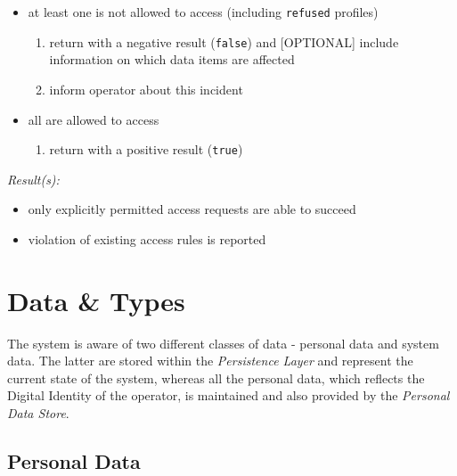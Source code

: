 \documentclass[12pt,english,a4paper,titlepage,cleardoublepage=empty,dottedtoc]{report}
\providecommand{\tightlist}{%
  \setlength{\itemsep}{0pt}\setlength{\parskip}{0pt}}
\begin{document}
\begin{enumerate}
\begin{itemize}
    \begin{itemize}
    \tightlist
    \item
      at least one is not allowed to access (including \texttt{refused}
      profiles)

      \begin{enumerate}
      \def\labelenumii{\arabic{enumii})}
      \tightlist
      \item
        return with a negative result (\texttt{false}) and
        {[}OPTIONAL{]} include information on which data items are
        affected
      \item
        inform operator about this incident
      \end{enumerate}
    \item
      all are allowed to access

      \begin{enumerate}
      \def\labelenumii{\arabic{enumii})}
      \tightlist
      \item
        return with a positive result (\texttt{true})
      \end{enumerate}
    \end{itemize}
  \end{itemize}
\end{enumerate}

\emph{Result(s):}

\begin{itemize}
\tightlist
\item
  only explicitly permitted access requests are able to succeed
\item
  violation of existing access rules is reported
\end{itemize}

\section{Data \& Types}\label{data-types}

The system is aware of two different classes of data - personal data and
system data. The latter are stored within the \emph{Persistence Layer}
and represent the current state of the system, whereas all the personal
data, which reflects the Digital Identity of the operator, is maintained
and also provided by the \emph{Personal Data Store}.

\subsection{Personal Data}\label{personal-data}
\end{document}

